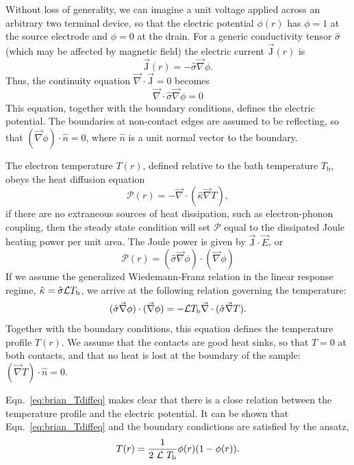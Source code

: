Without loss of generality, we can imagine a unit voltage applied across an arbitrary two terminal device, so that the electric potential $\phi (r)$ has $\phi = 1$ at the source electrode and $\phi = 0$ at the drain. For a generic conductivity tensor $\hat\sigma$ (which may be affected by magnetic field) the electric current $\vec{\mathrm{J}}(r)$ is
\begin{equation}
\vec{\mathrm{J}}(r) = -\hat\sigma\vec\nabla\phi .
\end{equation}
Thus, the continuity equation $\vec\nabla\cdot\vec{\mathrm{J}}=0$ becomes
\begin{equation}
\vec\nabla\cdot\hat\sigma\vec\nabla\phi=0
\end{equation}
This equation, together with the boundary conditions, defines the electric potential. The boundaries at non-contact edges are assumed to be reflecting, so that $(\vec\nabla\phi)\cdot\hat{n}=0$, where $\hat{n}$ is a unit normal vector to the boundary.

The electron temperature $T(r)$, defined relative to the bath temperature $T_\mathrm{b}$, obeys the heat diffusion equation
\begin{equation}
\mathcal{P}(r) = -\vec\nabla\cdot(\hat\kappa\vec\nabla T),
\end{equation}
if there are no extraneous sources of heat dissipation, such as electron-phonon coupling, then the steady state condition will set $\mathcal{P}$  equal to the dissipated Joule heating power per unit area. The Joule power is given by $\vec{\mathrm{J}}\cdot\vec{E}$, or
\begin{equation}
\mathcal{P}(r) = (\hat\sigma\vec\nabla\phi)\cdot(\vec\nabla\phi)
\label{eq:brian_qdot}
\end{equation}
If we assume the generalized Wiedemann-Franz relation in the linear response regime, $\hat\kappa = \hat\sigma\mathcal{L} T_\mathrm{b}$, we arrive at the following relation governing the temperature:
\begin{equation}\label{eq:brian_Tdiffeq}
(\hat\sigma\vec\nabla\phi)\cdot(\vec\nabla\phi) = -\mathcal{L} T_\mathrm{b}\vec\nabla\cdot(\hat\sigma\vec\nabla T).
\end{equation}
Together with the boundary conditions, this equation defines the temperature profile $T(r)$. We assume that the contacts are good heat sinks, so that $T = 0$ at both contacts,
and that no heat is lost at the boundary of the sample: $(\vec\nabla T)\cdot\hat{n} = 0$.

Eqn.~\ref{eq:brian_Tdiffeq} makes clear that there is a close relation between the temperature profile and the electric potential. It can be shown that Eqn.~\ref{eq:brian_Tdiffeq} and the boundary condictions are satisfied by the ansatz,
\begin{equation}\label{eq:brian_Tprofile}
T(r)=\frac{1}{2~\mathcal{L}~T_\mathrm{b}}\phi(r)(1-\phi(r)).
\end{equation}

